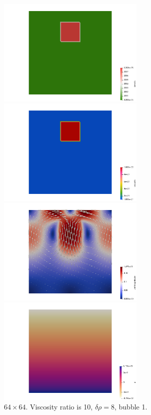 \begin{center}
\includegraphics[width=7cm]{python_codes/fieldstone_72/results/block/full/density}
\includegraphics[width=7cm]{python_codes/fieldstone_72/results/block/full/viscosity}\\
\includegraphics[width=7cm]{python_codes/fieldstone_72/results/block/full/vel}
\includegraphics[width=7cm]{python_codes/fieldstone_72/results/block/full/p}\\
{\captionfont $64\times 64$. Viscosity ratio is 10, $\delta \rho=8$, bubble 1.}
\end{center}

